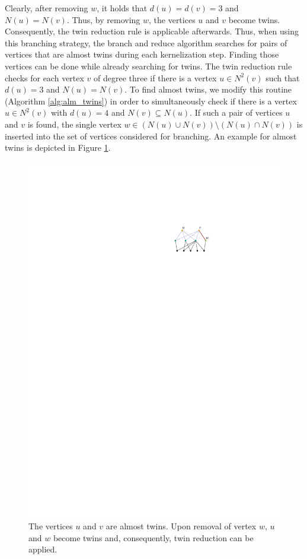 \documentclass[12pt,a4paper,twoside]{scrartcl}
\numberwithin{equation}{section}
\begin{document}
Clearly, after removing $w$, it holds that $d(u)=d(v)=3$ and $N(u)=N(v)$. Thus, by removing $w$, the vertices $u$ and $v$ become twins. Consequently, the twin reduction rule is applicable afterwards. Thus, when using this branching strategy, the branch and reduce algorithm searches for pairs of vertices that are almost twins during each kernelization step. Finding those vertices can be done while already searching for twins. The twin reduction rule checks for each vertex $v$ of degree three if there is a vertex $u \in N^2(v)$ such that $d(u) = 3$ and $N(u)=N(v)$. To find almost twins, we modify this routine (Algorithm \ref{alg:alm_twins}) in order to simultaneously check if there is a vertex $u \in N^2(v)$ with $d(u) = 4$ and $N(v)\subseteq  N(u)$. If such a pair of vertices $u$ and $v$ is found, the single vertex $w\in (N(u)\cup N(v))\setminus(N(u) \cap N(v))$ is inserted into the set of vertices considered for branching. An example for almost twins is depicted in Figure \ref{fig:alm_twin}.\\

\begin{figure}[htb]
	\captionsetup{belowskip=1em}
	\includegraphics[scale=1.5]{images/alm_twin}
	\centering
	\caption{The vertices $u$ and $v$ are almost twins. Upon removal of vertex $w$, $u$ and $w$ become twins and, consequently, twin reduction can be applied.}
	\label{fig:alm_twin}
\end{figure}
\end{document}
